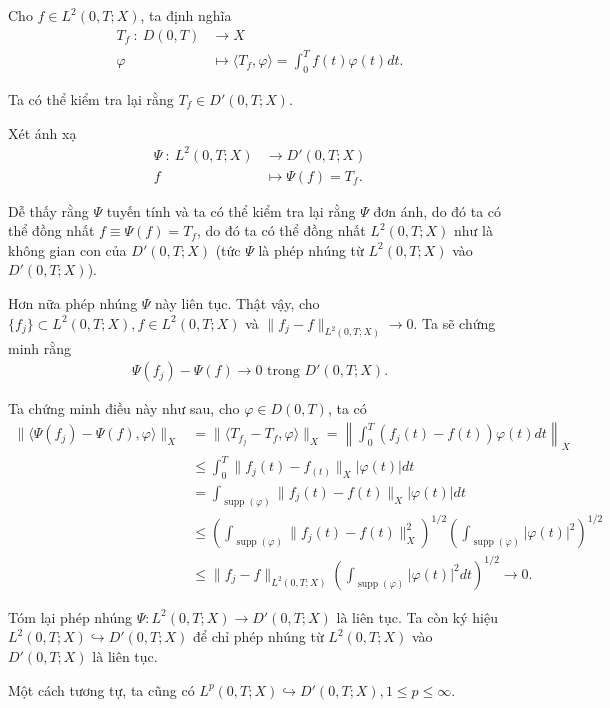 \documentclass[12pt,a4paper]{article}
\DeclareMathOperator{\supp}{supp}
\theoremstyle{definition}
\theoremstyle{definition}
\begin{document}
Cho $f \in L^2(0,T;X)$, ta định nghĩa
\begin{align*}
    T_f \: : \: D(0,T) &\to X \\
    \varphi &\longmapsto \langle T_f, \varphi \rangle = \int_0^T f(t)\varphi(t) dt.
\end{align*}

Ta có thể kiểm tra lại rằng $T_f \in D'(0,T;X).$

Xét ánh xạ
\begin{align*}
    \Psi \: : \: L^2(0,T;X) &\to D'(0,T;X) \\
    f &\longmapsto \Psi(f) = T_f.
\end{align*}

Dễ thấy rằng $\Psi$ tuyến tính và ta có thể kiểm tra lại rằng $\Psi$ đơn ánh, do đó ta có thể đồng nhất $f \equiv \Psi(f) = T_f$, do đó ta có thể đồng nhất $L^2(0,T;X)$ như là không gian con của $D'(0,T;X)$ (tức $\Psi$ là phép nhúng từ $L^2(0,T;X)$ vào $D'(0,T;X)$).

Hơn nữa phép nhúng $\Psi$ này liên tục. Thật vậy, cho $\{f_j\} \subset L^2(0,T;X), f \in L^2(0,T;X)$ và $\|f_j - f\|_{L^2(0,T;X)} \to 0$. Ta sẽ chứng minh rằng
\begin{align*}
    \Psi(f_j) - \Psi(f) \to 0 \text{ trong } D'(0,T;X).
\end{align*}

Ta chứng minh điều này như sau, cho $\varphi \in D(0,T)$, ta có
\begin{align*}
    \|\langle \Psi(f_j) - \Psi(f), \varphi \rangle\|_X
    &= \|\langle T_{f_j} - T_f, \varphi \rangle\|_X
    = \left\| \int_0^T \left(f_j(t) - f(t)\right) \varphi(t) dt \right\|_X \\
    &\le \int_0^T \|f_j(t) - f_(t)\|_X |\varphi(t)| dt \\
    &= \int_{\supp(\varphi)}\|f_j(t) - f(t)\|_X |\varphi(t)| dt \\
    &\le \left(\int_{\supp(\varphi)} \|f_j(t) - f(t)\|^2_X\right)^{1/2} \left(\int_{\supp(\varphi)} |\varphi(t)|^2\right)^{1/2} \\
    &\le \|f_j - f\|_{L^2(0,T;X)}\left(\int_{\supp(\varphi)} |\varphi(t)|^2 dt\right)^{1/2}
    \to 0.
\end{align*}

Tóm lại phép nhúng $\Psi : L^2(0,T;X) \to D'(0,T;X)$ là liên tục. Ta còn ký hiệu $L^2(0,T;X) \hookrightarrow D'(0,T;X)$ để chỉ phép nhúng từ $L^2(0,T;X)$ vào $D'(0,T;X)$ là liên tục.

Một cách tương tự, ta cũng có $L^p(0,T;X) \hookrightarrow D'(0,T;X), 1 \le p \le \infty$.
\end{document}
